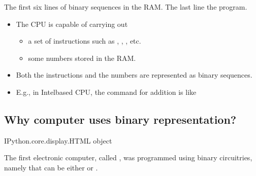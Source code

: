 \documentclass[letterpaper,10pt,english]{sphinxmanual}
\begin{document}
The first six lines of binary sequences in the RAM. The last line  the program.
\begin{itemize}
\item {} 
The CPU is capable of carrying out
\begin{itemize}
\item {} 
a set of instructions such as , , , etc.

\item {} 
some numbers stored in the RAM.

\end{itemize}

\item {} 
Both the instructions and the numbers are represented as binary sequences.

\item {} 
E.g., in Intel\sphinxhyphen{}based CPU, the command for addition is like 

\end{itemize}


\subsection{Why computer uses binary representation?}
\label{\detokenize{Lecture1/Introduction to Computer Programming:why-computer-uses-binary-representation}}
\begin{sphinxVerbatim}[commandchars=\\\{\}]
    
\end{sphinxVerbatim}

\begin{sphinxVerbatim}[commandchars=\\\{\}]
\PYGZlt{}IPython.core.display.HTML object\PYGZgt{}
\end{sphinxVerbatim}

 The first electronic computer, called , was programmed using binary circuitries, namely  that can be either  or .
\end{document}
